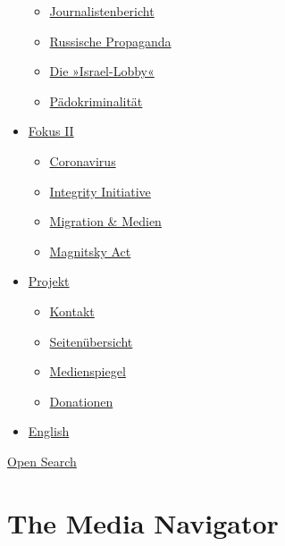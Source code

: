 \begin{itemize}
  \begin{itemize}
  \tightlist
  \item
    \href{https://swprs.org/bericht-eines-journalisten/}{Journalistenbericht}
  \item
    \href{https://swprs.org/russische-propaganda/}{Russische Propaganda}
  \item
    \href{https://swprs.org/die-israel-lobby-fakten-und-mythen/}{Die
    »Israel-Lobby«}
  \item
    \href{https://swprs.org/geopolitik-und-paedokriminalitaet/}{Pädokriminalität}
  \end{itemize}
\item
  \href{https://swprs.org/migration-und-medien/}{Fokus II}

  \begin{itemize}
  \tightlist
  \item
    \href{https://swprs.org/covid-19-hinweis-ii/}{Coronavirus}
  \item
    \href{https://swprs.org/die-integrity-initiative/}{Integrity
    Initiative}
  \item
    \href{https://swprs.org/migration-und-medien/}{Migration \& Medien}
  \item
    \href{https://swprs.org/der-fall-magnitsky/}{Magnitsky Act}
  \end{itemize}
\item
  \href{https://swprs.org/kontakt/}{Projekt}

  \begin{itemize}
  \tightlist
  \item
    \href{https://swprs.org/kontakt/}{Kontakt}
  \item
    \href{https://swprs.org/uebersicht/}{Seitenübersicht}
  \item
    \href{https://swprs.org/medienspiegel/}{Medienspiegel}
  \item
    \href{https://swprs.org/donationen/}{Donationen}
  \end{itemize}
\item
  \href{https://swprs.org/contact/}{English}
\end{itemize}

\protect\hyperlink{}{Open Search}

\hypertarget{the-media-navigator}{%
\section{The Media Navigator}\label{the-media-navigator}}

